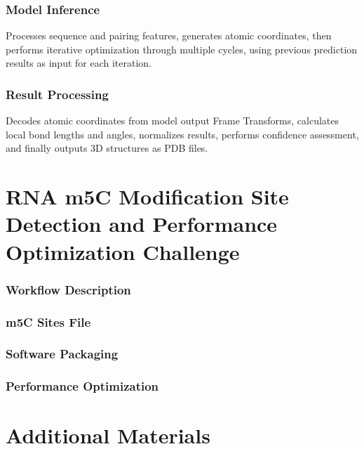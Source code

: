 \documentclass[a4paper,12pt]{article}
\begin{document}
\subsubsection{Model Inference}
Processes sequence and pairing features, generates atomic coordinates, then performs iterative optimization through multiple cycles, using previous prediction results as input for each iteration.

\subsubsection{Result Processing}
Decodes atomic coordinates from model output Frame Transforms, calculates local bond lengths and angles, normalizes results, performs confidence assessment, and finally outputs 3D structures as PDB files.

\newpage

\section{RNA m5C Modification Site Detection and Performance Optimization Challenge}

\subsubsection{Workflow Description}

\subsubsection{m5C Sites File}

\subsubsection{Software Packaging}

\subsubsection{Performance Optimization}

\newpage

\section{Additional Materials}
\end{document}
